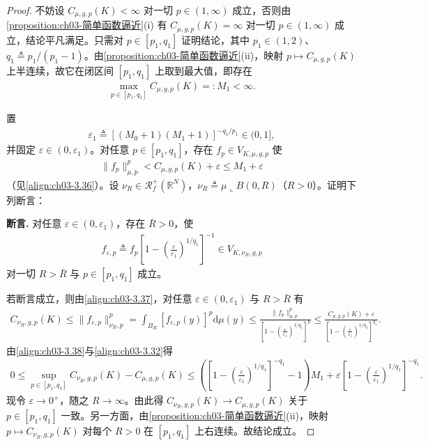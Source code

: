 \documentclass[../../main.tex]{subfiles}%
\begin{document}
\begin{proof}
不妨设 $C_{\mu,g,p}(K)<\infty$ 对一切 $p\in(1,\infty)$ 成立，否则由\cref{proposition:ch03-简单函数逼近}(i) 有 $C_{\mu,g,p}(K)=\infty$ 对一切 $p\in(1,\infty)$ 成立，结论平凡满足。只需对 $p\in[p_1,q_1]$ 证明结论，其中 $p_1\in(1,2)$、$q_1\triangleq p_1/(p_1-1)$。由\cref{proposition:ch03-简单函数逼近}(ii)，映射 $p\mapsto C_{\mu,g,p}(K)$ 上半连续，故它在闭区间 $[p_1,q_1]$ 上取到最大值，即存在
\begin{align}
\max_{p\in[p_1,q_1]}C_{\mu,g,p}(K)=:M_1<\infty.\label{align:ch03-3.36}
\end{align}

置
\begin{align*}
\varepsilon_1\triangleq\left[(M_0+1)(M_1+1)\right]^{-q_1/p_1}\in(0,1],
\end{align*}
并固定 $\varepsilon\in(0,\varepsilon_1)$。对任意 $p\in[p_1,q_1]$，存在 $f_p\in V_{K,\mu,g,p}$ 使
\begin{align}
\|f_p\|_{\mu,p}^p<C_{\mu,g,p}(K)+\varepsilon\leqslant M_1+\varepsilon\label{align:ch03-3.37}
\end{align}
（见\eqref{align:ch03-3.36}）。设 $\nu_R\in\mathscr{R}^+_f(\mathbb{R}^N)$，$\nu_R\triangleq\mu\llcorner B(0,R)$（$R>0$）。证明下列断言：

\textbf{断言.} 对任意 $\varepsilon\in(0,\varepsilon_1)$，存在 $\bar R>0$，使
\begin{align*}
f_{\varepsilon,p}\triangleq f_p\left[1-\left(\frac{\varepsilon}{\varepsilon_1}\right)^{1/q_1}\right]^{-1}\in V_{K,\nu_R,g,p}
\end{align*}
对一切 $R>\bar R$ 与 $p\in[p_1,q_1]$ 成立。

若断言成立，则由\eqref{align:ch03-3.37}，对任意 $\varepsilon\in(0,\varepsilon_1)$ 与 $R>\bar R$ 有
\begin{align}
C_{\nu_R,g,p}(K)\leqslant\|f_{\varepsilon,p}\|_{\nu_R,p}^p=\int_{B_R}\left[f_{\varepsilon,p}(y)\right]^p\mathrm{d}\mu(y)
\leqslant\frac{\|f_p\|_{\mu,p}^p}{\left[1-\left(\frac{\varepsilon}{\varepsilon_1}\right)^{1/q_1}\right]^p}
\leqslant\frac{C_{\mu,g,p}(K)+\varepsilon}{\left[1-\left(\frac{\varepsilon}{\varepsilon_1}\right)^{1/q_1}\right]^{q_1}} .\label{align:ch03-3.38}
\end{align}
由\eqref{align:ch03-3.38}与\eqref{align:ch03-3.32}得
\begin{align*}
0\leqslant\sup_{p\in[p_1,q_1]}C_{\nu_R,g,p}(K)-C_{\mu,g,p}(K)
\leqslant\left(\left[1-\left(\frac{\varepsilon}{\varepsilon_1}\right)^{1/q_1}\right]^{-q_1}-1\right)M_1
+\varepsilon\left[1-\left(\frac{\varepsilon}{\varepsilon_1}\right)^{1/q_1}\right]^{-q_1}.
\end{align*}
现令 $\varepsilon\to0^+$，随之 $R\to\infty$。由此得 $C_{\nu_R,g,p}(K)\to C_{\mu,g,p}(K)$ 关于 $p\in[p_1,q_1]$ 一致。另一方面，由\cref{proposition:ch03-简单函数逼近}(ii)，映射 $p\mapsto C_{\nu_R,g,p}(K)$ 对每个 $R>0$ 在 $[p_1,q_1]$ 上右连续。故结论成立。


\end{proof}
\end{document}
